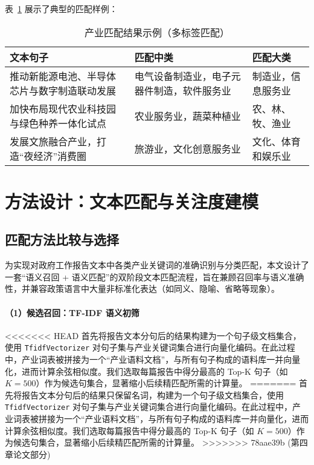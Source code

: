 \documentclass[a4paper,11pt, fontset=fandol]{ctexart}
\begin{document}
\vspace{0.5em}
\noindent 表~\ref{tab:match_example} 展示了典型的匹配样例：

\begin{table}[H]
\centering
\caption{产业匹配结果示例（多标签匹配）}
\label{tab:match_example}
\begin{tabular}{p{6cm}p{5cm}p{3cm}}
\hline
\textbf{文本句子} & \textbf{匹配中类} & \textbf{匹配大类} \\
\hline
推动新能源电池、半导体芯片与数字制造联动发展 & 电气设备制造业，电子元器件制造，软件服务业 & 制造业，信息服务业 \\
加快布局现代农业科技园与绿色种养一体化试点 & 农业服务业，蔬菜种植业 & 农、林、牧、渔业 \\
发展文旅融合产业，打造“夜经济”消费圈 & 旅游业，文化创意服务业 & 文化、体育和娱乐业 \\
\hline
\end{tabular}
\end{table}


\newpage


\section{方法设计：文本匹配与关注度建模}


\subsection{匹配方法比较与选择}
为实现对政府工作报告文本中各类产业关键词的准确识别与分类匹配，本文设计了一套“语义召回 + 语义匹配”的双阶段文本匹配流程，旨在兼顾召回率与语义准确性，并兼容政策语言中大量非标准化表达（如同义、隐喻、省略等现象）。

\paragraph{（1）候选召回：TF-IDF 语义初筛}

<<<<<<< HEAD
首先将报告文本分句后的结果构建为一个句子级文档集合，使用 \texttt{TfidfVectorizer} 对句子集与产业关键词集合进行向量化编码。在此过程中，产业词表被拼接为一个“产业语料文档”，与所有句子构成的语料库一并向量化，进而计算余弦相似度。我们选取每篇报告中得分最高的 Top-K 句子（如 $K=500$）作为候选句集合，显著缩小后续精匹配所需的计算量。
=======
首先将报告文本分句后的结果只保留名词，构建为一个句子级文档集合，使用 \texttt{TfidfVectorizer} 对句子集与产业关键词集合进行向量化编码。在此过程中，产业词表被拼接为一个“产业语料文档”，与所有句子构成的语料库一并向量化，进而计算余弦相似度。我们选取每篇报告中得分最高的 Top-K 句子（如 $K=500$）作为候选句集合，显著缩小后续精匹配所需的计算量。
>>>>>>> 78aae39b (第四章论文部分)
\end{document}
